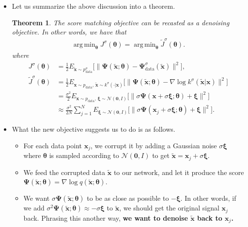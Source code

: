 \documentclass[10pt]{article}
\newtheorem{theorem}[lemma]{Theorem}
\newcommand{\ve}[1]{\mathbf{#1}}
\newcommand{\mrm}[1]{\mathrm{#1}}
\newcommand{\ves}[1]{\boldsymbol{#1}}
\newcommand{\mcal}[1]{\mathcal{#1}}
\DeclareMathOperator*{\argmin}{arg\,min}
\begin{document}
\begin{itemize}
  \item Let us summarize the above discussion into a theorem.
  
  \begin{theorem}
    The score matching objective can be recasted as a denoising objective. In other words, we have that
    \begin{align*}
      \argmin_{\ves{\theta}} J^\sigma(\ves{\theta}) = \argmin_{\ves{\theta}} \widetilde{J}^\sigma(\ves{\theta}).
    \end{align*}
    where
    \begin{align*}
      J^\sigma(\ves{\theta}) 
      &= \frac{1}{2} E_{\widetilde{\ve{x}} \sim p^\sigma_{\mrm{data}}} \Big[ \big\| \ves{\Psi}(\widetilde{\ve{x}};\ves{\theta}) - \ves{\Psi}^\sigma_{\mrm{data}}(\widetilde{\ve{x}}) \big\|^2 \Big], \\
      \widetilde{J}^\sigma(\ves{\theta}) 
      &= \frac{1}{2} E_{\ve{x}\sim p_{\mrm{data}},\, \widetilde{\ve{x}} \sim k^\sigma(\cdot|\ve{x})} \Big[ \big\|
      \ves{\Psi}(\widetilde{\ve{x}};\ves{\theta}) - \nabla \log k^\sigma(\widetilde{\ve{x}}|\ve{x})
      \big\|^2 \Big] \\
      &= \frac{\sigma^2}{2}  E_{\ve{x}\sim p_{\mrm{data}},\, \ves{\xi} \sim \mcal{N}(\ve{0},I)} \big[ \big\|
      \sigma \ves{\Psi}(\ve{x} + \sigma \ves{\xi};\ves{\theta}) + \ves{\xi}
      \big\|^2 \big] \\
      &\approx \frac{\sigma^2}{2N} \sum_{j=1}^N E_{\ves{\xi} \sim \mcal{N}(\ve{0},I )} \Big[ \big\|
      \sigma \ves{\Psi}(\ve{x}_j + \sigma \ves{\xi}; \ves{\theta}) + \ves{\xi} \big\|^2
      \Big].
    \end{align*}
  \end{theorem}

  \item What the new objective suggests us to do is as follows.
  \begin{itemize}
    \item For each data point $\ve{x}_j$, we corrupt it by adding a Gaussian noise $\sigma \ves{\xi}$ where $\ves{\theta}$ is sampled according to $\mcal{N}(\ve{0},I)$ to get $\widetilde{\ve{x}} = \ve{x}_j + \sigma \ves{\xi}$.
    
    \item We feed the corrupted data $\widetilde{\ve{x}}$ to our network, and let it produce the score $\ves{\Psi}(\widetilde{\ve{x}};\ves{\theta}) = \nabla \log q(\widetilde{\ve{x}};\ves{\theta})$.
    
    \item We want $\sigma \ves{\Psi}(\widetilde{\ve{x}};\ves{\theta})$ to be as close as possible to $-\ves{\xi}$. In other words, if we add $\sigma^2 \ves{\Psi}(\widetilde{\ve{x}};\ves{\theta}) \approx -\sigma \ves{\xi}$ to $\widetilde{\ve{x}}$, we should get the original signal $\ve{x}_j$ back. Phrasing this another way, {\bf we want to denoise $\widetilde{\ve{x}}$ back to $\ve{x}_j$.}
  \end{itemize}


\end{itemize}
\end{document}
